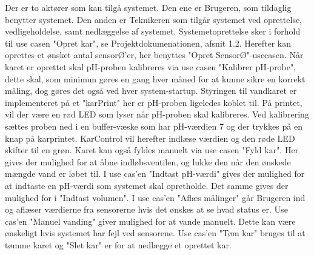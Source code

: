 Der er to aktører som kan tilgå systemet. Den ene er Brugeren, som tildaglig benytter systemet. Den anden er Teknikeren som tilgår systemet ved oprettelse, vedligeholdelse, samt nedlæggelse af systemet.\newline 
Systemetoprettelse sker i forhold til use casen "Opret kar", se Projektdokumenationen, afsnit 1.2. Herefter kan oprettes et ønsket antal sensorØ'er, her benyttes "Opret SensorØ"-usecasen. Når karet er oprettet skal pH-proben kalibreres via use casen "Kalibrer pH-probe", dette skal, som minimun gøres en gang hver måned for at kunne sikre en korrekt måling, dog gøres det også ved hver system-startup.\newline 
Styringen til vandkaret er implementeret på et "karPrint" her er pH-proben ligeledes koblet til. På printet, vil der være en rød LED som lyser når pH-proben skal kalibreres. Ved kalibrering sættes proben ned i en buffer-væske som har pH-værdien 7 og der trykkes på en knap på karprintet. KarControl vil herefter indlæse værdien og den røde LED skifter til en grøn. Karet kan også fyldes manuelt via use casen "Fyld kar". Her gives der mulighed for at åbne indløbsventilen, og lukke den når den ønskede mængde vand er løbet til.\newline 
I use cas'en "Indtast pH-værdi" gives der mulighed for at indtaste en pH-værdi som systemet skal opretholde. Det samme gives der mulighed for i "Indtast volumen". I use cas'en "Aflæs målinger" går Brugeren ind og aflæser værdierne fra sensorerne hvis det ønskes at se hvad status er. Use cas'en "Manuel vanding" giver mulighed for at vande manuelt. Dette kan være ønskeligt hvis systemet har fejl ved sensorene. Use cas'en "Tøm kar" bruges til at tømme karet og "Slet kar" er for at nedlægge et oprettet kar.
